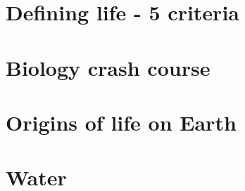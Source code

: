 \documentclass[DIV=calc, paper=a4, fontsize=12pt]{scrartcl}	 %
\begin{document}
\section*{Defining life - 5 criteria}

\begin{multicols}{2}



\end{multicols}

\section*{Biology crash course}

\begin{multicols}{2}



\end{multicols}

\section*{Origins of life on Earth}

\begin{multicols}{2}




\end{multicols}

\section*{Water}

\begin{multicols}{2}









\pagebreak

\end{multicols}
\end{document}
